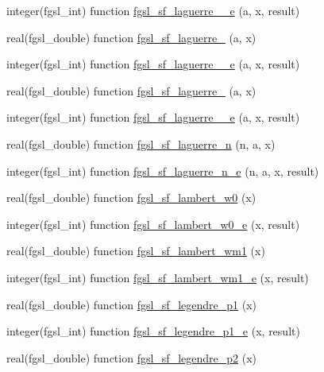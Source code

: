 \begin{DoxyCompactItemize}
integer(fgsl\-\_\-int) function \hyperlink{specfunc_8finc_a599bfb76f67c77fcfcd272e971224c3b}{fgsl\-\_\-sf\-\_\-laguerre\-\_\-\_\-e} (a, x, result)
\item 
real(fgsl\-\_\-double) function \hyperlink{specfunc_8finc_aea3ca5431913e8573dcaade93a1d5255}{fgsl\-\_\-sf\-\_\-laguerre\-\_} (a, x)
\item 
integer(fgsl\-\_\-int) function \hyperlink{specfunc_8finc_af1c3e3b6b4459d9383a9a94a8eca1f42}{fgsl\-\_\-sf\-\_\-laguerre\-\_\-\_\-e} (a, x, result)
\item 
real(fgsl\-\_\-double) function \hyperlink{specfunc_8finc_a83902835346ca0e6af9816d85f2b3c85}{fgsl\-\_\-sf\-\_\-laguerre\-\_} (a, x)
\item 
integer(fgsl\-\_\-int) function \hyperlink{specfunc_8finc_a5217c8d0228eb2c947aa79b59d677258}{fgsl\-\_\-sf\-\_\-laguerre\-\_\-\_\-e} (a, x, result)
\item 
real(fgsl\-\_\-double) function \hyperlink{specfunc_8finc_a16713f52eee01f82af0324da5f57ffa1}{fgsl\-\_\-sf\-\_\-laguerre\-\_\-n} (n, a, x)
\item 
integer(fgsl\-\_\-int) function \hyperlink{specfunc_8finc_a9768949b164412b7e758faf5c505dc1e}{fgsl\-\_\-sf\-\_\-laguerre\-\_\-n\-\_\-e} (n, a, x, result)
\item 
real(fgsl\-\_\-double) function \hyperlink{specfunc_8finc_a6aff0287bf8a1c5b0a42a6f8a1f4d46b}{fgsl\-\_\-sf\-\_\-lambert\-\_\-w0} (x)
\item 
integer(fgsl\-\_\-int) function \hyperlink{specfunc_8finc_a5b5826857aea38ebf608d399147b4cac}{fgsl\-\_\-sf\-\_\-lambert\-\_\-w0\-\_\-e} (x, result)
\item 
real(fgsl\-\_\-double) function \hyperlink{specfunc_8finc_a888c8f8f84824ad675730060333efac0}{fgsl\-\_\-sf\-\_\-lambert\-\_\-wm1} (x)
\item 
integer(fgsl\-\_\-int) function \hyperlink{specfunc_8finc_a43be02b4dffc9595930a1161342d91ee}{fgsl\-\_\-sf\-\_\-lambert\-\_\-wm1\-\_\-e} (x, result)
\item 
real(fgsl\-\_\-double) function \hyperlink{specfunc_8finc_ae078a1a7a0d1f73399c6fb75b80ac199}{fgsl\-\_\-sf\-\_\-legendre\-\_\-p1} (x)
\item 
integer(fgsl\-\_\-int) function \hyperlink{specfunc_8finc_a42d2c1164bef96a014bd173ddac852ff}{fgsl\-\_\-sf\-\_\-legendre\-\_\-p1\-\_\-e} (x, result)
\item 
real(fgsl\-\_\-double) function \hyperlink{specfunc_8finc_aed1db565bdfb41fe1d48aa49e14cf3a3}{fgsl\-\_\-sf\-\_\-legendre\-\_\-p2} (x)
\item 

\end{DoxyCompactItemize}
